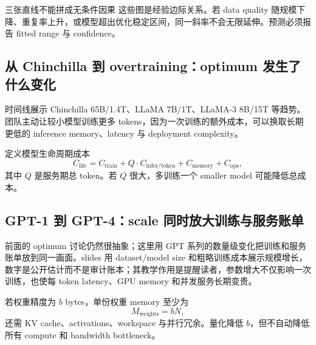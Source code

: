 
\begin{warningbox}{三张直线不能拼成无条件因果}
这些图是经验边际关系。若 data quality 随规模下降、重复率上升，或模型超出优化稳定区间，同一斜率不会无限延伸。预测必须报告 fitted range 与 confidence。
\end{warningbox}

\subsection{从 Chinchilla 到 overtraining：optimum 发生了什么变化}

时间线展示 Chinchilla 65B/1.4T、LLaMA 7B/1T、LLaMA-3 8B/15T 等趋势。团队主动让较小模型训练更多 tokens，因为一次训练的额外成本，可以换取长期更低的 inference memory、latency 与 deployment complexity。


定义模型生命周期成本
\[
C_{\text{life}}=C_{\text{train}}+Q\cdot C_{\text{infer/token}}+C_{\text{memory}}+C_{\text{ops}},
\]
其中 $Q$ 是服务期总 token。若 $Q$ 很大，多训练一个 smaller model 可能降低总成本。


\subsection{GPT-1 到 GPT-4：scale 同时放大训练与服务账单}

前面的 optimum 讨论仍然很抽象；这里用 GPT 系列的数量级变化把训练和服务账单放到同一画面。slides 用 dataset/model size 和粗略训练成本展示规模增长，数字是公开估计而不是审计账本；其教学作用是提醒读者，参数增大不仅影响一次训练，也使每 token latency、GPU memory 和并发服务长期变贵。



若权重精度为 $b$ bytes，单份权重 memory 至少为
\[
M_{\text{weights}}=bN,
\]
还需 KV cache、activations、workspace 与并行冗余。量化降低 $b$，但不自动降低所有 compute 和 bandwidth bottleneck。

